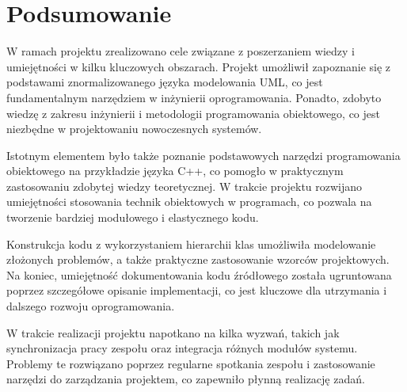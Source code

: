 \documentclass[11pt]{article}
\begin{document}
\section{Podsumowanie}
\par W ramach projektu zrealizowano cele związane z poszerzaniem wiedzy i umiejętności w kilku kluczowych obszarach. Projekt umożliwił zapoznanie się z podstawami znormalizowanego języka modelowania UML, co jest fundamentalnym narzędziem w inżynierii oprogramowania. Ponadto, zdobyto wiedzę z zakresu inżynierii i metodologii programowania obiektowego, co jest niezbędne w projektowaniu nowoczesnych systemów.
\par Istotnym elementem było także poznanie podstawowych narzędzi programowania obiektowego na przykładzie języka C++, co pomogło w praktycznym zastosowaniu zdobytej wiedzy teoretycznej. W trakcie projektu rozwijano umiejętności stosowania technik obiektowych w programach, co pozwala na tworzenie bardziej modułowego i elastycznego kodu.
\par Konstrukcja kodu z wykorzystaniem hierarchii klas umożliwiła modelowanie złożonych problemów, a także praktyczne zastosowanie wzorców projektowych. Na koniec, umiejętność dokumentowania kodu źródłowego została ugruntowana poprzez szczegółowe opisanie implementacji, co jest kluczowe dla utrzymania i dalszego rozwoju oprogramowania.
\par W trakcie realizacji projektu napotkano na kilka wyzwań, takich jak synchronizacja pracy zespołu oraz integracja różnych modułów systemu. Problemy te rozwiązano poprzez regularne spotkania zespołu i zastosowanie narzędzi do zarządzania projektem, co zapewniło płynną realizację zadań.
\end{document}
